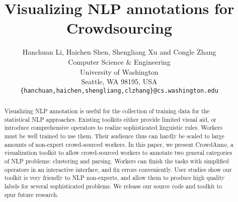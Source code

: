 \documentclass[11pt]{article}
\title{Visualizing NLP annotations for Crowdsourcing }
\author{Hanchuan Li, Haichen Shen, Shengliang Xu and Congle Zhang\\
 Computer Science \& Engineering \\
 University of Washington\\
 Seattle, WA 98195, USA \\
 {\tt \{hanchuan,haichen,shengliang,clzhang\}@cs.washington.edu} \\}
\newcommand{\sys}{\mbox{\sc CrowdAnno}}   %
\begin{document}
\maketitle

\begin{abstract}
Visualizing NLP annotation is useful for the collection of training data for the statistical NLP approaches.  Existing toolkits either provide limited visual aid, or introduce comprehensive operators to realize sophisticated linguistic rules. Workers must be well trained to use them. Their audience thus can hardly be scaled to large amounts of non-expert crowd-sourced workers. In this paper, we present \sys, a visualization toolkit to allow crowd-sourced workers to annotate two general categories of NLP problems: clustering and parsing. Workers can finish the tasks with simplified operators in an interactive interface, and fix errors conveniently. User studies show our toolkit is very friendly to NLP non-experts, and allow them to produce high quality labels for several sophisticated problems. We release our source code and toolkit to spur future research.
\end{abstract}




%
%






%


\end{document}

